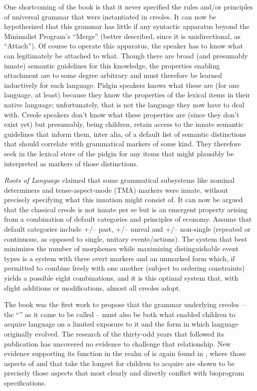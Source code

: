 One shortcoming of the book is that it never specified the rules and/or principles of universal grammar that were instantiated in creoles. It can now be hypothesized that this grammar has little if any syntactic apparatus beyond the Minimalist Program’s “Merge” (better described, since it is unidirectional, as “Attach”). Of course to operate this apparatus, the speaker has to know what can legitimately be attached to what. Though there are broad (and presumably innate) semantic guidelines for this knowledge, the properties enabling attachment are to some degree arbitrary and must therefore be learned inductively for each language. Pidgin speakers knows what these are (for one language, at least) because they know the properties of the lexical items in their native language; unfortunately, that is not the language they now have to deal with. Creole speakers don’t know what these properties are (since they don’t exist yet) but presumably, being children, retain access to the innate semantic guidelines that inform them, inter alia, of a default list of semantic distinctions that should correlate with grammatical markers of some kind. They therefore seek in the lexical store of the pidgin for any items that might plausibly be interpreted as markers of those distinctions.

\textit{Roots of Language} claimed that some grammatical subsystems like nominal determiners and tense-aspect-mode (TMA) markers were innate, without precisely specifying what this innatism might consist of. It can now be argued that the classical creole  is not innate per se but is an emergent property arising from a combination of default categories and principles of economy. Assume that default categories include +/– past, +/– unreal and +/– non-single (repeated or continuous, as opposed to single, unitary events/actions). The system that best minimizes the number of morphemes while maximizing distinguishable event types is a system with three overt markers and an unmarked form which, if permitted to combine freely with one another (subject to ordering constraints) yields a possible eight combinations, and it is this optimal system that, with slight additions or modifications, almost all creoles adopt.

The book was the first work to propose that the grammar underlying creoles~-- the “” as it came to be called -- must also be both what enabled children to acquire language on a limited exposure to it and the form in which language originally evolved. The research of the thirty-odd years that followed its publication has uncovered no evidence to challenge that relationship. New evidence supporting its function in the realm of is again found in \citet[Chapter 7]{Bickerton2014}, where those aspects of  and  that take the longest  for children to acquire are shown to be precisely those aspects that most clearly and directly conflict with bioprogram specifications.

